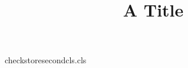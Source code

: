 \begin{filecontents*}[force]{checkstoresecondcls.cls}
\def\extrainfo#1{\gdef\@extrainfo{#1}}\def\@extrainfo{}
\renewcommand\maketitle{\par{\Large\@title\par}\ifnum\c@tp=0 {\@extrainfo\par}\fi}
\end{filecontents*}
\documentclass{checkstoresecondcls}
\title{A Title}
\maketitle
Between.
\setcounter{tp}{1}
\maketitle
Text.


